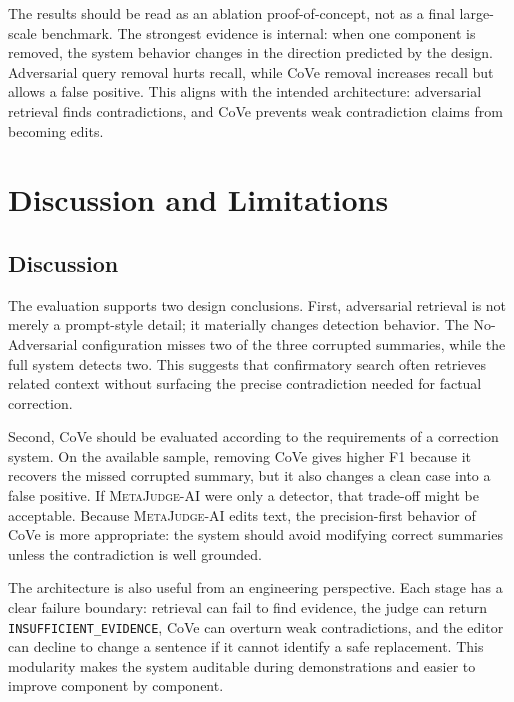 \documentclass[12pt, a4paper]{report}
\newcommand{\sys}{\textsc{MetaJudge-AI}}
\begin{document}
The results should be read as an ablation proof-of-concept, not as a final
large-scale benchmark. The strongest evidence is internal: when one component is
removed, the system behavior changes in the direction predicted by the design.
Adversarial query removal hurts recall, while CoVe removal increases recall but
allows a false positive. This aligns with the intended architecture: adversarial
retrieval finds contradictions, and CoVe prevents weak contradiction claims from
becoming edits.


\chapter{Discussion and Limitations}

\section{Discussion}
\label{Discussion}

The evaluation supports two design conclusions. First, adversarial retrieval is
not merely a prompt-style detail; it materially changes detection behavior. The
No-Adversarial configuration misses two of the three corrupted summaries, while
the full system detects two. This suggests that confirmatory search often
retrieves related context without surfacing the precise contradiction needed for
factual correction.

Second, CoVe should be evaluated according to the requirements of a correction
system. On the available sample, removing CoVe gives higher F1 because it
recovers the missed corrupted summary, but it also changes a clean case into a
false positive. If \sys{} were only a detector, that trade-off might be
acceptable. Because \sys{} edits text, the precision-first behavior of CoVe is
more appropriate: the system should avoid modifying correct summaries unless the
contradiction is well grounded.

The architecture is also useful from an engineering perspective. Each stage has
a clear failure boundary: retrieval can fail to find evidence, the judge can
return \texttt{INSUFFICIENT\_EVIDENCE}, CoVe can overturn weak contradictions,
and the editor can decline to change a sentence if it cannot identify a safe
replacement. This modularity makes the system auditable during demonstrations
and easier to improve component by component.
\end{document}
